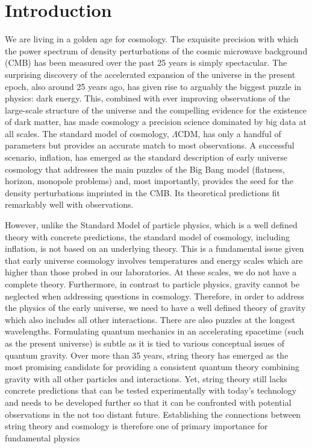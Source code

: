 \startdocument

\section{Introduction}



We are living in a golden age for cosmology. The exquisite precision with which the power spectrum of density perturbations of the cosmic microwave background (CMB) has been measured over the past 25 years is simply spectacular. The surprising discovery of the accelerated expansion of the universe in the present epoch, also around  25 years ago, has given rise to arguably the biggest puzzle in physics: dark energy. This, combined with ever improving observations of the large-scale structure of the universe and the compelling evidence for the existence of dark matter,  has made cosmology a precision science dominated by big data at all scales. The standard model of cosmology, $\Lambda$CDM, 
has only a handful of parameters but provides an accurate match to most observations. A successful scenario, inflation, has emerged as the standard description of early universe cosmology that addresses the main puzzles of the Big Bang model (flatness, horizon, monopole problems) and, most importantly, provides the seed for the density perturbations imprinted in the CMB. Its theoretical predictions fit remarkably well with observations.

However, unlike the Standard Model of particle physics, which is a well defined theory with concrete predictions, the standard model of cosmology, including inflation, is not based on an underlying theory. This is a fundamental  issue given  that early universe cosmology involves  temperatures and energy scales which are  higher than those probed in our  laboratories. At these scales, we do not have a complete theory. Furthermore, in contrast to particle physics, gravity cannot be neglected when addressing questions in cosmology. Therefore, in order to address the physics of the early universe, we need to have a well defined theory of gravity which also includes all other interactions. There are also puzzles at the longest wavelengths.
Formulating quantum mechanics in an accelerating spacetime (such as the present universe) is subtle as it is tied to various conceptual issues of quantum gravity.  Over more than 35 years, string theory has emerged as the most promising candidate for providing a consistent quantum 
 theory combining gravity with all other particles and interactions. Yet, string theory still lacks concrete predictions that can be tested experimentally with today's technology   and needs to be developed further so that it can be
confronted with potential observations in the not too distant future. Establishing the connections between string theory and cosmology is therefore one of primary importance for fundamental physics

